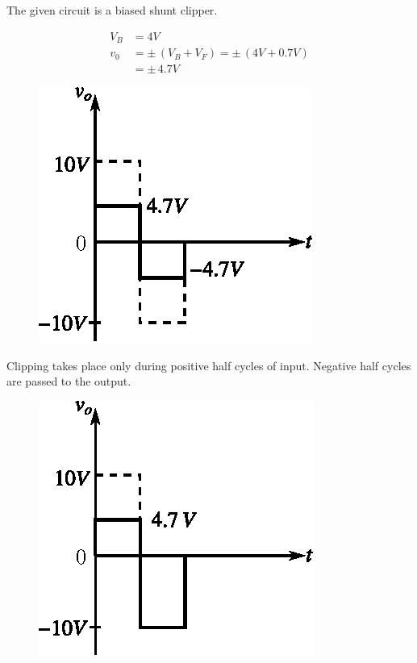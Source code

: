 \begin{solution}

The given circuit is a biased shunt clipper.
\begin{center}
\begin{minipage}[c]{7cm}
\begin{align*}
V_{B} &= 4V\\[3pt]
v_{0} &= \pm\, (V_{B}+V_{F})=\pm\, (4V+0.7V)\\[3pt]
&= \pm\, 4.7V
\end{align*}
\end{minipage}
\quad
\begin{minipage}[c]{5cm}
\begin{figure}[H]
\centering
\includegraphics{chap2/sol2.47a.eps}
\end{figure}
\end{minipage}
\end{center}

\eject

\begin{center}
\begin{minipage}[c]{7cm}
Clipping takes place only during positive half cycles of input. Negative half cycles are passed to the output.
\end{minipage}
\quad
\begin{minipage}[c]{5cm}
\begin{figure}[H]
\centering
\includegraphics{chap2/sol2.47b.eps}
\end{figure}
\end{minipage}
\end{center}


\end{solution}
